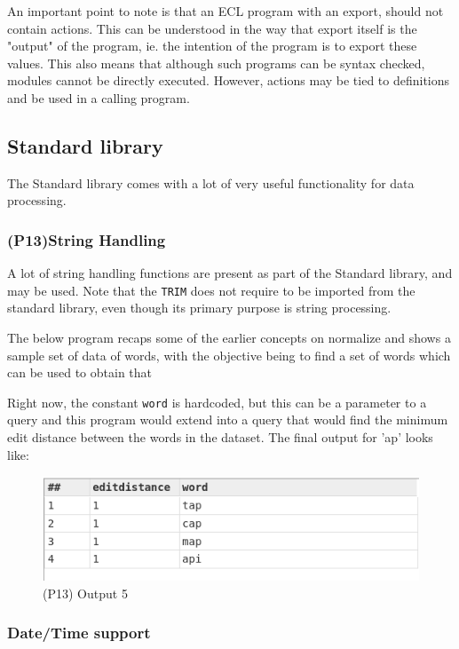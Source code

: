 \documentclass[a4paper,oneside,12pt]{book}
\begin{document}
An important point to note is that an ECL program with an export, should not contain actions. This can be understood in the way that export itself is the "output" of the program, ie. the intention of the program is to export these values. This also means that although such programs can be syntax checked, modules cannot be directly executed. However, actions may be tied to definitions and be used in a calling program.


\subsection{Standard library}

The Standard library comes with a lot of very useful functionality for data processing.

\subsubsection[String Handling]{(P13)String Handling}

A lot of string handling functions are present as part of the Standard library, and may be used. Note that the \lstinline{TRIM} does not require to be imported from the standard library, even though its primary purpose is string processing.

The below program recaps some of the earlier concepts on normalize and shows a sample set of data of words, with the objective being to find a set of words which can be used to obtain that 



Right now, the constant \lstinline{word} is hardcoded, but this can be a parameter to a query and this program would extend into a query that would find the minimum edit distance between the words in the dataset.
The final output for 'ap' looks like:

\begin{figure}[h]
    \centering
    \includegraphics[width=.6\linewidth]{../output/76/5}
    \caption{(P13) Output 5}
\end{figure}

\subsubsection{Date/Time support}
\end{document}
